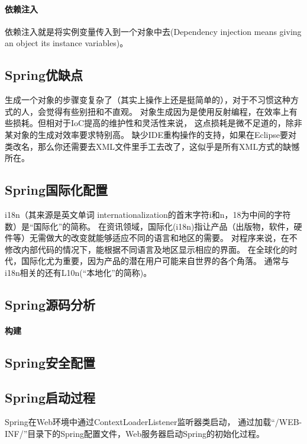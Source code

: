 \documentclass{book}
\begin{document}
\paragraph{依赖注入}

依赖注入就是将实例变量传入到一个对象中去(Dependency injection means giving an object its instance variables)。

\subsection{Spring优缺点}

生成一个对象的步骤变复杂了（其实上操作上还是挺简单的），对于不习惯这种方式的人，会觉得有些别扭和不直观。
对象生成因为是使用反射编程，在效率上有些损耗。但相对于IoC提高的维护性和灵活性来说，
这点损耗是微不足道的，除非某对象的生成对效率要求特别高。
缺少IDE重构操作的支持，如果在Eclipse要对类改名，那么你还需要去XML文件里手工去改了，这似乎是所有XML方式的缺憾所在。

\subsection{Spring国际化配置}

i18n（其来源是英文单词 internationalization的首末字符i和n，18为中间的字符数）是“国际化”的简称。
在资讯领域，国际化(i18n)指让产品（出版物，软件，硬件等）无需做大的改变就能够适应不同的语言和地区的需要。
对程序来说，在不修改内部代码的情况下，能根据不同语言及地区显示相应的界面。 在全球化的时代，国际化尤为重要，因为产品的潜在用户可能来自世界的各个角落。
通常与i18n相关的还有L10n(“本地化”的简称)。

\subsection{Spring源码分析}

\paragraph{构建}

\subsection{Spring安全配置}

\subsection{Spring启动过程}

Spring在Web环境中通过ContextLoaderListener监听器类启动，
通过加载“/WEB-INF/”目录下的Spring配置文件，Web服务器启动Spring的初始化过程。
\end{document}
